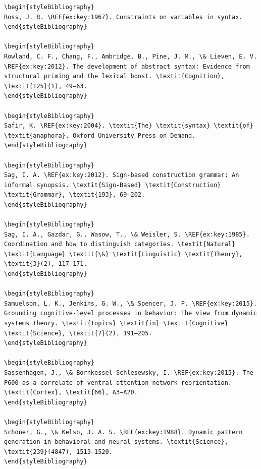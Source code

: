 \begin{verbatim}
\begin{styleBibliography}
Ross, J. R. \REF{ex:key:1967}. Constraints on variables in syntax.
\end{styleBibliography}

\begin{styleBibliography}
Rowland, C. F., Chang, F., Ambridge, B., Pine, J. M., \& Lieven, E. V. \REF{ex:key:2012}. The development of abstract syntax: Evidence from structural priming and the lexical boost. \textit{Cognition}, \textit{125}(1), 49–63.
\end{styleBibliography}

\begin{styleBibliography}
Safir, K. \REF{ex:key:2004}. \textit{The} \textit{syntax} \textit{of} \textit{anaphora}. Oxford University Press on Demand.
\end{styleBibliography}

\begin{styleBibliography}
Sag, I. A. \REF{ex:key:2012}. Sign-based construction grammar: An informal synopsis. \textit{Sign-Based} \textit{Construction} \textit{Grammar}, \textit{193}, 69–202.
\end{styleBibliography}

\begin{styleBibliography}
Sag, I. A., Gazdar, G., Wasow, T., \& Weisler, S. \REF{ex:key:1985}. Coordination and how to distinguish categories. \textit{Natural} \textit{Language} \textit{\&} \textit{Linguistic} \textit{Theory}, \textit{3}(2), 117–171.
\end{styleBibliography}

\begin{styleBibliography}
Samuelson, L. K., Jenkins, G. W., \& Spencer, J. P. \REF{ex:key:2015}. Grounding cognitive-level processes in behavior: The view from dynamic systems theory. \textit{Topics} \textit{in} \textit{Cognitive} \textit{Science}, \textit{7}(2), 191–205.
\end{styleBibliography}

\begin{styleBibliography}
Sassenhagen, J., \& Bornkessel-Schlesewsky, I. \REF{ex:key:2015}. The P600 as a correlate of ventral attention network reorientation. \textit{Cortex}, \textit{66}, A3–A20.
\end{styleBibliography}

\begin{styleBibliography}
Schoner, G., \& Kelso, J. A. S. \REF{ex:key:1988}. Dynamic pattern generation in behavioral and neural systems. \textit{Science}, \textit{239}(4847), 1513–1520.
\end{styleBibliography}


\end{verbatim}
